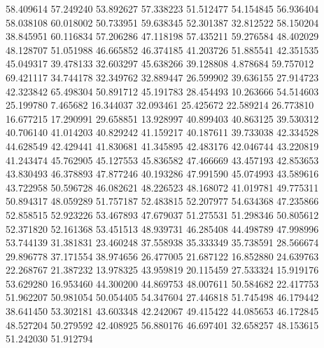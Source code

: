 58.409614
57.249240
53.892627
57.338223
51.512477
54.154845
56.936404
58.038108
60.018002
50.733951
59.638345
52.301387
32.812522
58.150204
38.845951
60.116834
57.206286
47.118198
57.435211
59.276584
48.402029
48.128707
51.051988
46.665852
46.374185
41.203726
51.885541
42.351535
45.049317
39.478133
32.603297
45.638266
39.128808
4.878684
59.757012
69.421117
34.744178
32.349762
32.889447
26.599902
39.636155
27.914723
42.323842
65.498304
50.891712
45.191783
28.454493
10.263666
54.514603
25.199780
7.465682
16.344037
32.093461
25.425672
22.589214
26.773810
16.677215
17.290991
29.658851
13.928997
40.899403
40.863125
39.530312
40.706140
41.014203
40.829242
41.159217
40.187611
39.733038
42.334528
44.628549
42.429441
41.830681
41.345895
42.483176
42.046744
43.220819
41.243474
45.762905
45.127553
45.836582
47.466669
43.457193
42.853653
43.830493
46.378893
47.877246
40.193286
47.991590
45.074993
43.589616
43.722958
50.596728
46.082621
48.226523
48.168072
41.019781
49.775311
50.894317
48.059289
51.757187
52.483815
52.207977
54.634368
47.235866
52.858515
52.923226
53.467893
47.679037
51.275531
51.298346
50.805612
52.371820
52.161368
53.451513
48.939731
46.285408
44.498789
47.998996
53.744139
31.381831
23.460248
37.558938
35.333349
35.738591
28.566674
29.896778
37.171554
38.974656
26.477005
21.687122
16.852880
24.639763
22.268767
21.387232
13.978325
43.959819
20.115459
27.533324
15.919176
53.629280
16.953460
44.300200
44.869753
48.007611
50.584682
22.417753
51.962207
50.981054
50.054405
54.347604
27.446818
51.745498
46.179442
38.641450
53.302181
43.603348
42.242067
49.415422
44.085653
46.172845
48.527204
50.279592
42.408925
56.880176
46.697401
32.658257
48.153615
51.242030
51.912794
